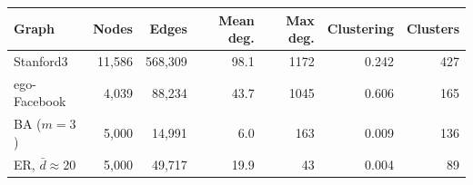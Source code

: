 \begin{tabular}{lrrrrrr}
\toprule
Graph & Nodes & Edges & Mean deg. & Max deg. & Clustering & Clusters \\
\midrule
Stanford3 & 11,586 & 568,309 & 98.1 & 1172 & 0.242 & 427 \\
ego-Facebook & 4,039 & 88,234 & 43.7 & 1045 & 0.606 & 165 \\
BA ($m=3$) & 5,000 & 14,991 & 6.0 & 163 & 0.009 & 136 \\
ER, $\bar d\approx 20$ & 5,000 & 49,717 & 19.9 & 43 & 0.004 & 89 \\
\bottomrule
\end{tabular}
